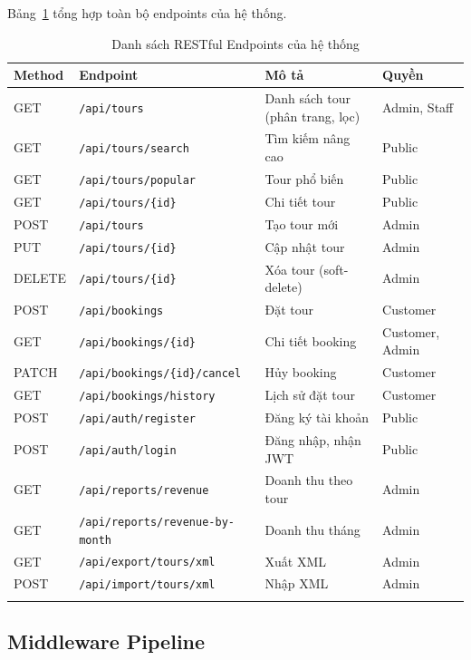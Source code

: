 \noindent Bảng~\ref{table:endpoints} tổng hợp toàn bộ
endpoints của hệ thống.

\begin{longtable}{|l|l|l|l|}
  \hline
  \textbf{Method} & \textbf{Endpoint} & \textbf{Mô tả} & \textbf{Quyền} \\
  \hline
  GET & \texttt{/api/tours} & Danh sách tour (phân trang, lọc)
      & Admin, Staff \\
  GET & \texttt{/api/tours/search} & Tìm kiếm nâng cao
      & Public \\
  GET & \texttt{/api/tours/popular} & Tour phổ biến
      & Public \\
  GET & \texttt{/api/tours/\{id\}} & Chi tiết tour
      & Public \\
  POST & \texttt{/api/tours} & Tạo tour mới
      & Admin \\
  PUT & \texttt{/api/tours/\{id\}} & Cập nhật tour
      & Admin \\
  DELETE & \texttt{/api/tours/\{id\}} & Xóa tour (soft-delete)
      & Admin \\
  \hline
  POST & \texttt{/api/bookings} & Đặt tour
      & Customer \\
  GET & \texttt{/api/bookings/\{id\}} & Chi tiết booking
      & Customer, Admin \\
  PATCH & \texttt{/api/bookings/\{id\}/cancel} & Hủy booking
      & Customer \\
  GET & \texttt{/api/bookings/history} & Lịch sử đặt tour
      & Customer \\
  \hline
  POST & \texttt{/api/auth/register} & Đăng ký tài khoản
      & Public \\
  POST & \texttt{/api/auth/login} & Đăng nhập, nhận JWT
      & Public \\
  \hline
  GET & \texttt{/api/reports/revenue} & Doanh thu theo tour
      & Admin \\
  GET & \texttt{/api/reports/revenue-by-month} & Doanh thu tháng
      & Admin \\
  GET & \texttt{/api/export/tours/xml} & Xuất XML
      & Admin \\
  POST & \texttt{/api/import/tours/xml} & Nhập XML
      & Admin \\
  \hline
  \caption{Danh sách RESTful Endpoints của hệ thống}
  \label{table:endpoints}
\end{longtable}

\subsection{Middleware Pipeline}\label{sub3.2.2}

